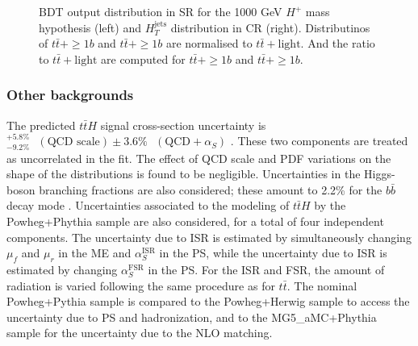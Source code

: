 \begin{figure}[H]
  \centering
  \caption{BDT output distribution in SR for the 1000 GeV $H^{+}$ mass hypothesis (left) and $H_{T}^{\text{jets}}$ distribution in CR (right). Distributinos of $t\bar{t}+\geq1b$ and $t\bar{t}+\geq1b$ are normalised to $t\bar{t}+\text{light}$. And the ratio to $t\bar{t}+\text{light}$ are computed for $t\bar{t}+\geq1b$ and $t\bar{t}+\geq1b$.}
  \label{fig:CompTtbarShape}
\end{figure}


\subsubsection{Other backgrounds}
\label{subsec:SystOfOtherBkg}
The predicted $t\bar{t}H$ signal cross-section uncertainty is ${}^{+5.8\%}_{-9.2\%}\text{ }(\text{QCD scale})\pm{3.6\%}\text{ }(\text{QCD}+{\alpha}_{S})$ \cite{deFlorian:2016spz, R.Raitio-1979, W.Beenaller-2002, S.Dawson-2003, Y.Zhang-2014, S.Frixione-2015}. These two components are treated as uncorrelated in the fit. The effect of QCD scale and PDF variations on the shape of the distributions is found to be negligible. Uncertainties in the Higgs-boson branching fractions are also considered; these amount to 2.2\% for the $b\bar{b}$ decay mode \cite{deFlorian:2016spz}. Uncertainties associated to the modeling of $t\bar{t}H$ by the Powheg+Phythia sample are also considered, for a total of four independent components. The uncertainty due to ISR  is estimated by simultaneously changing $\mu_{f}$ and $\mu_{r}$ in the ME and ${\alpha}^{\text{ISR}}_{S}$ in the PS, while the uncertainty due to ISR is estimated by changing ${\alpha}^{\text{FSR}}_{S}$ in the PS. For the ISR and FSR, the amount of radiation is varied following the same procedure as for $t\bar{t}$. The nominal Powheg+Pythia sample is compared to the Powheg+Herwig sample to access the uncertainty due to PS and hadronization, and to the MG5\_aMC+Phythia sample for the uncertainty due to the NLO matching.


